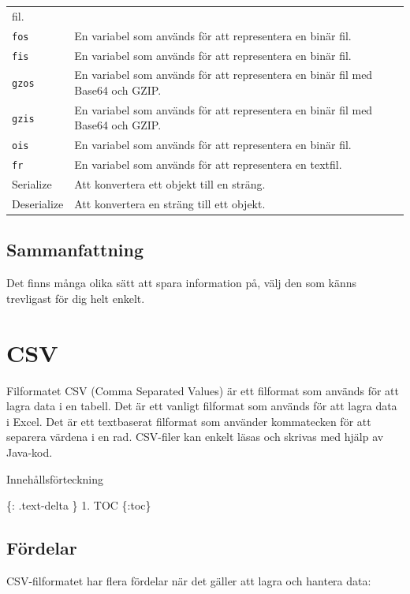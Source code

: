\begin{longtable}[]{@{}
  >{\raggedright\arraybackslash}p{}
  >{\raggedright\arraybackslash}p{}@{}}
fil. \\
\texttt{fos} & En variabel som används för att representera en binär
fil. \\
\texttt{fis} & En variabel som används för att representera en binär
fil. \\
\texttt{gzos} & En variabel som används för att representera en binär
fil med Base64 och GZIP. \\
\texttt{gzis} & En variabel som används för att representera en binär
fil med Base64 och GZIP. \\
\texttt{ois} & En variabel som används för att representera en binär
fil. \\
\texttt{fr} & En variabel som används för att representera en
textfil. \\
Serialize & Att konvertera ett objekt till en sträng. \\
Deserialize & Att konvertera en sträng till ett objekt. \\
\end{longtable}

\hypertarget{sammanfattning}{%
\subsection{Sammanfattning}\label{sammanfattning}}

Det finns många olika sätt att spara information på, välj den som känns
trevligast för dig helt enkelt.

\hypertarget{csv}{%
\section{CSV}\label{csv}}

Filformatet CSV (Comma Separated Values) är ett filformat som används
för att lagra data i en tabell. Det är ett vanligt filformat som används
för att lagra data i Excel. Det är ett textbaserat filformat som
använder kommatecken för att separera värdena i en rad. CSV-filer kan
enkelt läsas och skrivas med hjälp av Java-kod.

Innehållsförteckning

\{: .text-delta \} 1. TOC \{:toc\}

\hypertarget{fuxf6rdelar}{%
\subsection{Fördelar}\label{fuxf6rdelar}}

CSV-filformatet har flera fördelar när det gäller att lagra och hantera
data:

